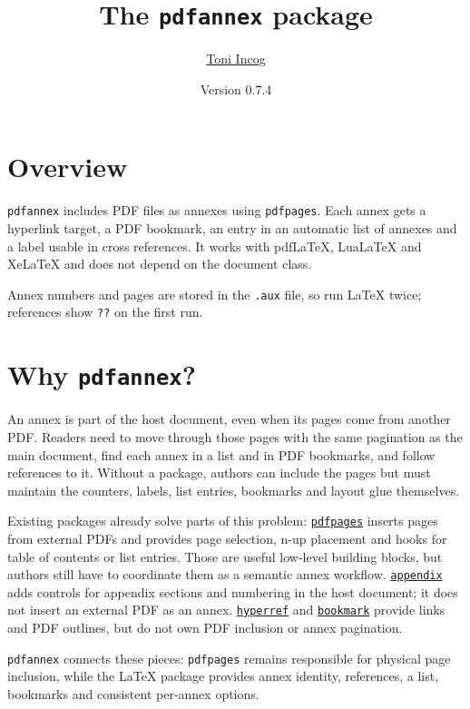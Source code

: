 \documentclass{article}
\title{The \texttt{pdfannex} package}
\author{\href{https://github.com/nocona71}{Toni Incog}}
\date{Version 0.7.4} %
\begin{document}
\maketitle

\section{Overview}

\texttt{pdfannex} includes PDF files as annexes using \texttt{pdfpages}. Each
annex gets a hyperlink target, a PDF bookmark, an entry in an automatic list of
annexes and a label usable in cross references. It works with pdfLaTeX,
LuaLaTeX and XeLaTeX and does not depend on the document class.

Annex numbers and pages are stored in the \texttt{.aux} file, so run \LaTeX{}
twice; references show \texttt{??} on the first run.

\section{Why \texttt{pdfannex}?}

An annex is part of the host document, even when its pages come from another
PDF. Readers need to move through those pages with the same pagination as the
main document, find each annex in a list and in PDF bookmarks, and follow
references to it. Without a package, authors can include the pages but must
maintain the counters, labels, list entries, bookmarks and layout glue
themselves.

Existing packages already solve parts of this problem:
\href{https://ctan.org/pkg/pdfpages}{\texttt{pdfpages}} inserts pages from
external PDFs and provides page selection, n-up placement and hooks for table
of contents or list entries. Those are useful low-level building blocks, but
authors still have to coordinate them as a semantic annex workflow.
\href{https://ctan.org/pkg/appendix}{\texttt{appendix}} adds controls for
appendix sections and numbering in the host document; it does not insert an
external PDF as an annex. \href{https://ctan.org/pkg/hyperref}{\texttt{hyperref}}
and \href{https://ctan.org/pkg/bookmark}{\texttt{bookmark}} provide links and
PDF outlines, but do not own PDF inclusion or annex pagination.

\texttt{pdfannex} connects these pieces: \texttt{pdfpages} remains responsible
for physical page inclusion, while the LaTeX package provides annex identity,
references, a list, bookmarks and consistent per-annex options.
\end{document}
